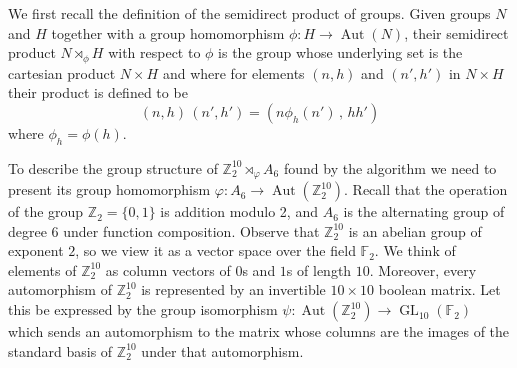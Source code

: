 \documentclass[10pt,leqno]{amsart}
\DeclareMathOperator{\Aut}{Aut}
\DeclareMathOperator{\GL}{GL}
\newcommand{\Z}{\mathbb{Z}}
\begin{document}
We first recall the definition of the semidirect product of groups. Given groups $N$ and $H$ together with a group homomorphism $\phi:H\to \Aut(N)$, their semidirect product $N\rtimes_\phi H$ with respect to $\phi$ is the group whose underlying set is the cartesian product $N\times H$ and where for elements $(n,h)$ and $(n',h')$ in $N\times H$ their product is defined to be
\[(n,h)\,(n',h')=(n\phi_h(n')\,,\,hh')\]
where $\phi_h=\phi(h)$.

To describe the group structure of $\mathbb{Z}_2^{10} \rtimes_\varphi A_6$ found by the algorithm we need to present its group homomorphism $\varphi:A_6 \to \Aut(\Z_2^{10})$. Recall that the operation of the group $\Z_2=\{0,1\}$ is addition modulo 2, and $A_6$ is the alternating group of degree 6 under function composition. Observe that $\Z_2^{10}$ is an abelian group of exponent $2$, so we view it as a vector space over the field $\mathbb{F}_2$. We think of elements of $\Z_2^{10}$ as column vectors of $0$s and $1$s of length $10$. Moreover, every automorphism of $\Z_2^{10}$ is represented by an invertible $10\times 10$ boolean matrix. Let this be expressed by the group isomorphism $\psi:\Aut(\Z_2^{10})\to \GL_{10}(\mathbb{F}_2)$ which sends an automorphism to the matrix whose columns are the images of the standard basis of $\Z_2^{10}$ under that automorphism. 
\end{document}
